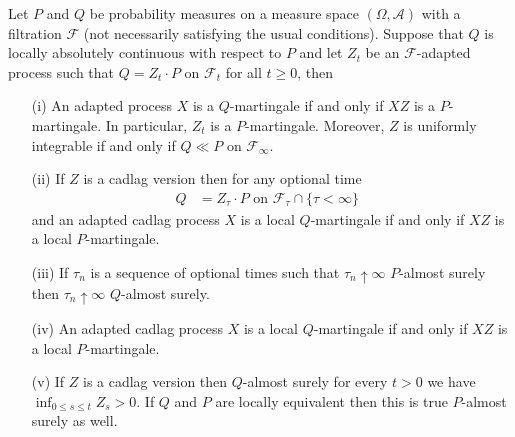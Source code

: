 \begin{lem}\label{LikelihoodRatioProcesses}Let $P$ and $Q$ be probability measures on a measure space $(\Omega, \mathcal{A})$ with a filtration $\mathcal{F}$ (not necessarily satisfying the usual conditions).   Suppose that $Q$ is locally absolutely continuous with respect to $P$ and let $Z_t$ be an $\mathcal{F}$-adapted process such that $Q = Z_t \cdot P$ on $\mathcal{F}_t$ for all $t \geq 0$, then 
\begin{itemize}
\item[(i)] An adapted process $X$ is a $Q$-martingale if and only if $X Z$ is a $P$-martingale.  In particular, $Z_t$ is a $P$-martingale.  Moreover, $Z$ is uniformly integrable if and only if $Q \ll P$ on $\mathcal{F}_\infty$.  
\item[(ii)] If $Z$ is a cadlag version then for any optional time
\begin{align*}
Q &= Z_\tau \cdot P \text{ on $\mathcal{F}_\tau \cap \lbrace \tau < \infty \rbrace$ }
\end{align*}
and an adapted cadlag process $X$ is a local $Q$-martingale if and only if $X Z$ is a local $P$-martingale.
\item[(iii)] If $\tau_n$ is a sequence of optional times such that $\tau_n \uparrow \infty$ $P$-almost surely then $\tau_n \uparrow \infty$ $Q$-almost surely.
\item[(iv)] An adapted cadlag process $X$ is a local $Q$-martingale if and only if $X Z$ is a local $P$-martingale.  
\item[(v)] If $Z$ is a cadlag version then $Q$-almost surely for every $t > 0$ we have $\inf_{0\leq s \leq t} Z_s > 0$.  If $Q$ and $P$ are locally equivalent then this is true $P$-almost surely as well.
\end{itemize}
\end{lem}
